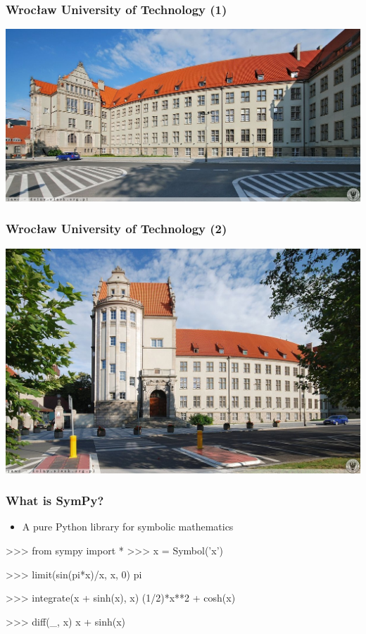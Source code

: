 \documentclass{beamer}
\begin{document}
\begin{frame}[fragile]
    \frametitle{Wrocław University of Technology (1)}

    \begin{center}
        \includegraphics[scale=0.25]{images/pwr1.jpg}
    \end{center}
\end{frame}

\begin{frame}[fragile]
    \frametitle{Wrocław University of Technology (2)}

    \begin{center}
        \includegraphics[scale=0.25]{images/pwr2.jpg}
    \end{center}
\end{frame}

\begin{frame}[fragile]
    \frametitle{What is SymPy?}

    \begin{itemize}
        \item A pure Python library for symbolic mathematics
    \end{itemize}

    \pause
    \begin{python}
  >>> from sympy import *
  >>> x = Symbol('x')

  >>> limit(sin(pi*x)/x, x, 0)
  pi

  >>> integrate(x + sinh(x), x)
  (1/2)*x**2 + cosh(x)

  >>> diff(_, x)
  x + sinh(x)
    \end{python}
\end{frame}
\end{document}
